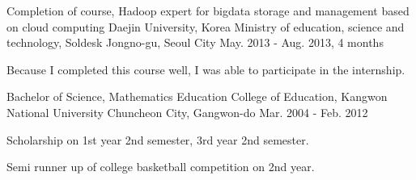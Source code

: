 

\begin{cventries}

  \cventry
    {Completion of course, Hadoop expert for bigdata storage and management based on cloud computing} %
    {Daejin University, Korea Ministry of education, science and technology, Soldesk} %
    {Jongno-gu, Seoul City} %
    {May. 2013 - Aug. 2013, 4 months} %
    {
      \begin{cvitems} %
        \item {Because I completed this course well, I was able to participate in the internship.}
      \end{cvitems}
    }

  \cventry
    {Bachelor of Science, Mathematics Education} %
    {College of Education, Kangwon National University} %
    {Chuncheon City, Gangwon-do} %
    {Mar. 2004 - Feb. 2012} %
    {
      \begin{cvitems} %
        \item {Scholarship on 1st year 2nd semester, 3rd year 2nd semester.}
        \item {Semi runner up of college basketball competition on 2nd year.}
      \end{cvitems}
    }

\end{cventries}
